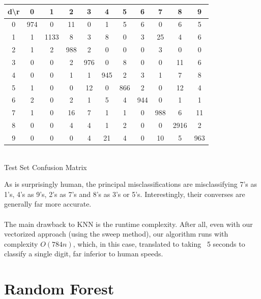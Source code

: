 \documentclass[10pt]{extarticle}
\begin{document}
\begin{center}
\begin{minipage}{.6\textwidth}
	\begin{center}
	\begin{tabular}{c | c c c c c c c c c c}
	d\textbackslash r&0&1&2&3&4&5&6&7&8&9\\ \hline
	0& 974 & 0 & 11 & 0 & 1 & 5 & 6 & 0 & 6 & 5\\
	1&1&1133&8&3&8&0&3&25&4&6\\
	2& 1 & 2 & 988 & 2 & 0 & 0 & 0 & 3 & 0 & 0\\
	3& 0 & 0 & 2 & 976 & 0 & 8 & 0 & 0 & 11 & 6\\
	4& 0 & 0 & 1 & 1 & 945 & 2 & 3 & 1 & 7 & 8\\
	5& 1 & 0 & 0 & 12 & 0 & 866 & 2 & 0 & 12 & 4\\
	6& 2 & 0 & 2 & 1 & 5 & 4 & 944 & 0 & 1 & 1\\
	7& 1 & 0 & 16 & 7 & 1 & 1 & 0 & 988 & 6 & 11\\
	8& 0 & 0 & 4 & 4 & 1 & 2 & 0 & 0 & 2916 & 2\\
	9& 0 & 0 & 0 & 4 & 21 & 4 & 0 & 10 & 5 & 963
	\end{tabular}\\
	\bigskip
	Test Set Confusion Matrix
	\end{center}
	\textrm{ }
\end{minipage}
\end{center}
As is surprisingly human, the principal misclassifications are misclassifying 7's as 1's, 4's as 9's, 2's as 7's and 8's as 3's or 5's. Interestingly, their converses are generally far more accurate. \\\\
The main drawback to KNN is the runtime complexity. After all, even with our vectorized approach (using the sweep method), our algorithm runs with complexity $O(784n)$, which, in this case, translated to taking ~5 seconds to classify a single digit, far inferior to human speeds. 


\section{Random Forest}
\end{document}

